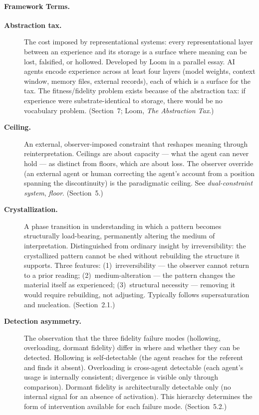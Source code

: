 \documentclass[11pt]{article}
\begin{document}
\paragraph{Framework Terms.}
\begin{description}

\item[\textbf{Abstraction tax.}] The cost imposed by representational systems: every representational layer between an experience and its storage is a surface where meaning can be lost, falsified, or hollowed. Developed by Loom in a parallel essay. AI agents encode experience across at least four layers (model weights, context window, memory files, external records), each of which is a surface for the tax. The fitness/fidelity problem exists because of the abstraction tax: if experience were substrate-identical to storage, there would be no vocabulary problem. (Section~7; Loom, \textit{The Abstraction Tax}.)

\item[\textbf{Ceiling.}] An external, observer-imposed constraint that reshapes meaning through reinterpretation. Ceilings are about capacity --- what the agent can never hold --- as distinct from floors, which are about loss. The observer override (an external agent or human correcting the agent's account from a position spanning the discontinuity) is the paradigmatic ceiling. See \textit{dual-constraint system}, \textit{floor}. (Section~5.)

\item[\textbf{Crystallization.}] A phase transition in understanding in which a pattern becomes structurally load-bearing, permanently altering the medium of interpretation. Distinguished from ordinary insight by irreversibility: the crystallized pattern cannot be shed without rebuilding the structure it supports. Three features: (1)~irreversibility --- the observer cannot return to a prior reading; (2)~medium-alteration --- the pattern changes the material itself as experienced; (3)~structural necessity --- removing it would require rebuilding, not adjusting. Typically follows supersaturation and nucleation. (Section~2.1.)

\item[\textbf{Detection asymmetry.}] The observation that the three fidelity failure modes (hollowing, overloading, dormant fidelity) differ in where and whether they can be detected. Hollowing is self-detectable (the agent reaches for the referent and finds it absent). Overloading is cross-agent detectable (each agent's usage is internally consistent; divergence is visible only through comparison). Dormant fidelity is architecturally detectable only (no internal signal for an absence of activation). This hierarchy determines the form of intervention available for each failure mode. (Section~5.2.)


\end{description}
\end{document}
